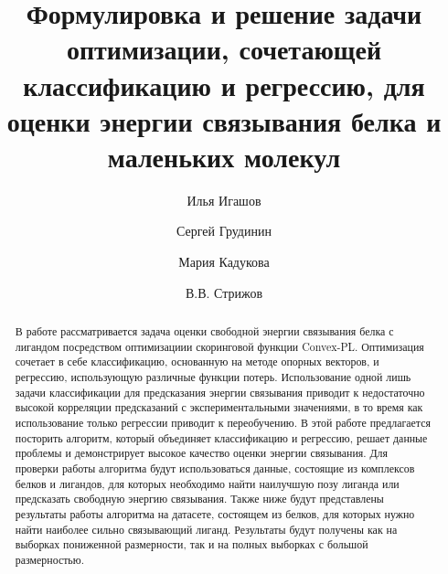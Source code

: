 \documentclass[preprint,12pt,3p]{elsarticle}
\begin{document}
\begin{frontmatter}

\title{Формулировка и решение задачи оптимизации, сочетающей классификацию и регрессию, для оценки энергии связывания белка и маленьких молекул}


\author{Илья Игашов}
\author{Сергей Грудинин}%

\author{Мария Кадукова}
\author{В.В. Стрижов}






\begin{abstract}
В работе рассматривается задача оценки свободной энергии связывания белка с лигандом  посредством оптимизациии скоринговой функции Convex-PL. Оптимизация сочетает в себе классификацию, основанную на методе опорных векторов, и регрессию, использующую различные функции потерь. Использование одной лишь задачи классификации для предсказания энергии связывания приводит к недостаточно высокой корреляции предсказаний с экспериментальными значениями, в то время как использование только регрессии приводит к переобучению. В этой работе предлагается посторить алгоритм, который объединяет классификацию и регрессию, решает данные проблемы и демонстрирует высокое качество оценки энергии связывания. Для проверки работы алгоритма будут использоваться данные, состоящие из комплексов белков и лигандов, для которых необходимо найти наилучшую позу лиганда или предсказать  свободную энергию связывания. Также ниже будут представлены результаты работы алгоритма на датасете, состоящем из белков, для которых нужно найти наиболее сильно связывающий лиганд. Результаты будут получены как на выборках пониженной размерности, так и на полных выборках с большой размерностью. 
\end{abstract}


\end{frontmatter}
\end{document}
